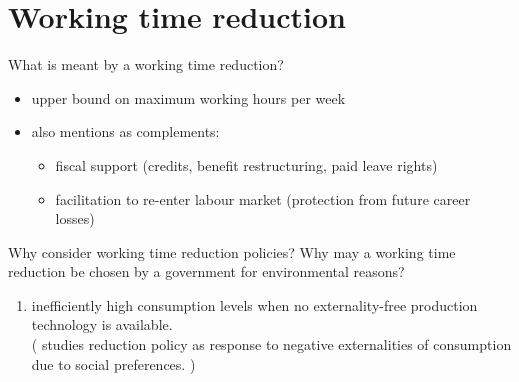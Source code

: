 \documentclass[11pt,aspectratio=169]{beamer}
\begin{document}
\section{Working time reduction}
\begin{frame}{What is meant by a working time reduction?}
	\begin{itemize}
		\item upper bound on maximum working hours per week
	\item \cite{Pullinger2014WorkingDesign} also mentions as complements:
	\begin{itemize}
\item fiscal support (credits, benefit restructuring, paid leave rights)
\item  facilitation to re-enter labour market (protection from future career losses)
	\end{itemize}
	
	\end{itemize}
	
\end{frame}



\begin{frame}{Why consider working time reduction policies?}
	Why may a working time reduction be chosen by a government for environmental reasons? 
\begin{enumerate}
\item inefficiently high consumption levels when no externality-free production technology is available.\\
(\cite{Alvarez-Cuadrado2007EnvyHours} studies reduction policy as response to negative externalities of consumption due to social preferences.  
) 
\end{enumerate}
\end{frame}
\end{document}
